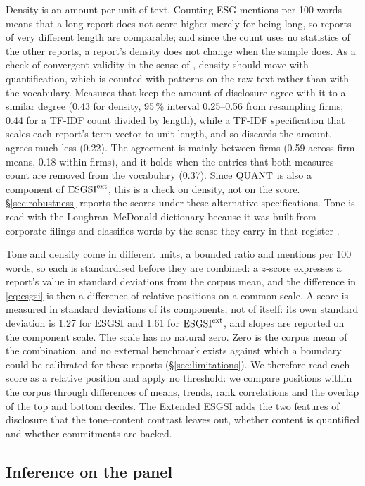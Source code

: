 Density is an amount per unit of text. Counting ESG mentions per 100 words
means that a long report does not score higher merely for being long,
so reports of very different length are comparable; and since the count uses
no statistics of the other reports, a report's density does not change when
the sample does. As a check of convergent validity in the sense of
\citet{campbell1959}, density should move with quantification, which is
counted with patterns on the raw text rather than with the vocabulary. Measures
that keep the amount of disclosure agree with it to a similar degree (0.43 for
density, 95\,\% interval 0.25--0.56 from resampling firms; 0.44 for a TF-IDF
count divided by length), while a TF-IDF specification that scales each
report's term vector to unit length, and so discards the amount, agrees much
less (0.22). The agreement is mainly between firms (0.59 across firm means,
0.18 within firms), and it holds when the entries that both measures count are
removed from the vocabulary (0.37). Since $\mathrm{QUANT}$ is also a component of
$\mathrm{ESGSI}^{\mathrm{ext}}$, this is a check on density, not on the score.
\S\ref{sec:robustness} reports the scores under these alternative
specifications. Tone is read with the
Loughran--McDonald dictionary because it was built from corporate filings and
classifies words by the sense they carry in that register \citep{loughran2011}.

Tone and density come in different units, a bounded ratio and mentions per
100 words, so each is standardised before they are combined: a $z$-score
expresses a report's value in standard deviations from the corpus mean, and
the difference in \eqref{eq:esgsi} is then a difference of relative positions
on a common scale. A score is measured in standard deviations of its
components, not of itself: its own standard deviation is 1.27 for $\mathrm{ESGSI}$
and 1.61 for $\mathrm{ESGSI}^{\mathrm{ext}}$, and slopes are reported on the component scale. The
scale has no natural zero. Zero is the corpus mean of
the combination, and no external benchmark exists against which a boundary
could be calibrated for these reports (\S\ref{sec:limitations}). We therefore
read each score as a relative position and apply no threshold: we compare
positions within the corpus through differences of means, trends, rank
correlations and the overlap of the top and bottom deciles. The Extended ESGSI
adds the two features of disclosure that the tone--content contrast leaves
out, whether content is quantified and whether commitments are backed.

\subsection{Inference on the panel}
\label{sec:method-inference}

